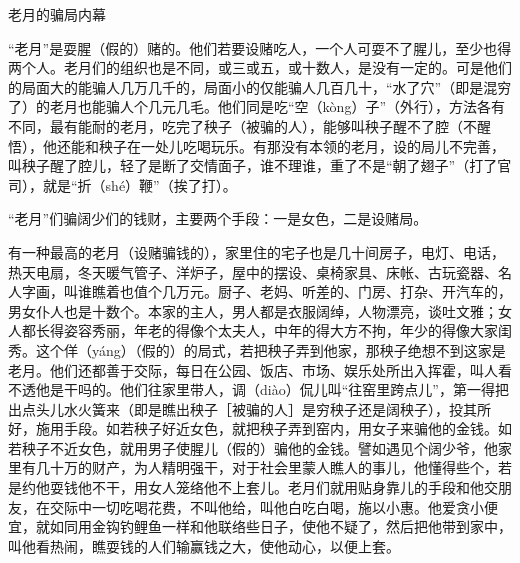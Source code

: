\documentclass[12pt,UTF8]{ctexbook}
\begin{document}
老月的骗局内幕


“老月”是耍腥（假的）赌的。他们若要设赌吃人，一个人可耍不了腥儿，至少也得两个人。老月们的组织也是不同，或三或五，或十数人，是没有一定的。可是他们的局面大的能骗人几万几千的，局面小的仅能骗人几百几十，“水了穴”（即是混穷了）的老月也能骗人个几元几毛。他们同是吃“空（kòng）子”（外行），方法各有不同，最有能耐的老月，吃完了秧子（被骗的人），能够叫秧子醒不了腔（不醒悟），他还能和秧子在一处儿吃喝玩乐。有那没有本领的老月，设的局儿不完善，叫秧子醒了腔儿，轻了是断了交情面子，谁不理谁，重了不是“朝了翅子”（打了官司），就是“折（shé）鞭”（挨了打）。

“老月”们骗阔少们的钱财，主要两个手段：一是女色，二是设赌局。



有一种最高的老月（设赌骗钱的），家里住的宅子也是几十间房子，电灯、电话，热天电扇，冬天暖气管子、洋炉子，屋中的摆设、桌椅家具、床帐、古玩瓷器、名人字画，叫谁瞧着也值个几万元。厨子、老妈、听差的、门房、打杂、开汽车的，男女仆人也是十数个。本家的主人，男人都是衣服阔绰，人物漂亮，谈吐文雅；女人都长得姿容秀丽，年老的得像个太夫人，中年的得大方不拘，年少的得像大家闺秀。这个佯（yáng）（假的）的局式，若把秧子弄到他家，那秧子绝想不到这家是老月。他们还都善于交际，每日在公园、饭店、市场、娱乐处所出入挥霍，叫人看不透他是干吗的。他们往家里带人，调（diào）侃儿叫“往窑里跨点儿”，第一得把出点头儿水火簧来（即是瞧出秧子［被骗的人］是穷秧子还是阔秧子），投其所好，施用手段。如若秧子好近女色，就把秧子弄到窑内，用女子来骗他的金钱。如若秧子不近女色，就用男子使腥儿（假的）骗他的金钱。譬如遇见个阔少爷，他家里有几十万的财产，为人精明强干，对于社会里蒙人瞧人的事儿，他懂得些个，若是约他耍钱他不干，用女人笼络他不上套儿。老月们就用贴身靠儿的手段和他交朋友，在交际中一切吃喝花费，不叫他给，叫他白吃白喝，施以小惠。他爱贪小便宜，就如同用金钩钓鲤鱼一样和他联络些日子，使他不疑了，然后把他带到家中，叫他看热闹，瞧耍钱的人们输赢钱之大，使他动心，以便上套。
\end{document}
